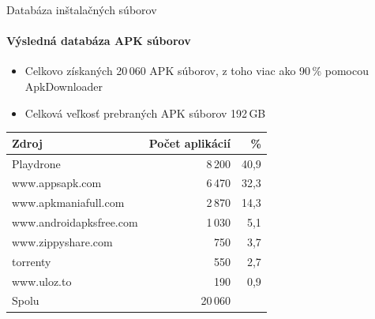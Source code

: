 \documentclass{beamer}
\begin{document}
  \begin{frame}[label=lists]{Databáza inštalačných súborov}
    \framesubtitle{Výsledná databáza APK súborov}
	\begin{itemize}
	\item Celkovo získaných 20\,060 APK súborov, z toho viac ako 90\,\% pomocou ApkDownloader
		\item Celková veľkosť prebraných APK súborov 192\,GB
\end{itemize}	    
    
    \begin{table}[htb]
\centering
  \begin{tabular}{l r r}
    
    \textbf{Zdroj} & \textbf{Počet aplikácií} & \textbf{\%} \\\hline
    Playdrone & 8\,200 & 40,9\\
    www.appsapk.com & 6\,470 & 32,3\\
    www.apkmaniafull.com & 2\,870 & 14,3\\
    www.androidapksfree.com & 1\,030 & 5,1\\
    www.zippyshare.com & 750 & 3,7\\
    torrenty & 550 & 2,7\\
    www.uloz.to & 190 & 0,9\\
    \hline
    Spolu & 20\,060 & \\
  \end{tabular}
  \label{tab:stahovanie}
\end{table}
  
\end{frame}  
  
\end{document}
